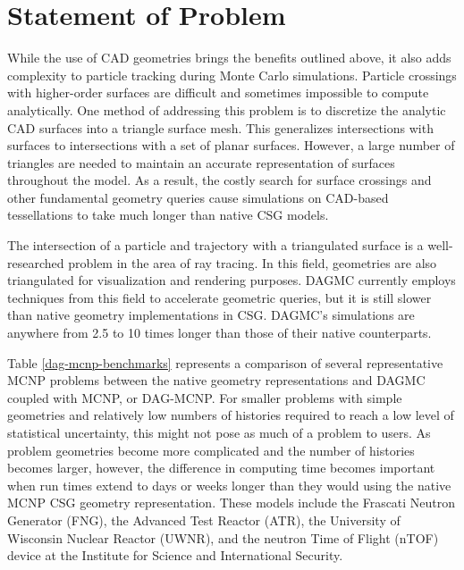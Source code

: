 \section{Statement of Problem}\label{sec:problem-statement}

While the use of CAD geometries brings the benefits outlined above, it also adds
complexity to particle tracking during Monte Carlo simulations. Particle
crossings with higher-order surfaces are difficult and sometimes impossible to
compute analytically. One method of addressing this problem is to discretize the
analytic CAD surfaces into a triangle surface mesh. This generalizes
intersections with surfaces to intersections with a set of planar
surfaces. However, a large number of triangles are needed to maintain an
accurate representation of surfaces throughout the model. As a result, the
costly search for surface crossings and other fundamental geometry
queries cause simulations on CAD-based tessellations
to take much longer than native CSG models.

The intersection of a particle and trajectory with a triangulated surface is a
well-researched problem in the area of ray tracing. In this field, geometries
are also triangulated for visualization and rendering purposes. DAGMC currently
employs techniques from this field to accelerate geometric queries, but it is
still slower than native geometry implementations in CSG. DAGMC's simulations
are anywhere from 2.5 to 10 times longer than those of their native
counterparts.

Table \ref{dag-mcnp-benchmarks} represents a comparison of several
representative MCNP problems between the native geometry representations and
DAGMC coupled with MCNP, or DAG-MCNP. For smaller problems with simple
geometries and relatively low numbers of histories required to reach a low level
of statistical uncertainty, this might not pose as much of a problem to
users. As problem geometries become more complicated and the number of histories
becomes larger, however, the difference in computing time becomes important when
run times extend to days or weeks longer than they would using the native MCNP
CSG geometry representation. These models include the Frascati Neutron Generator
(FNG), the Advanced Test Reactor (ATR), the University of Wisconsin Nuclear
Reactor (UWNR), and the neutron Time of Flight (nTOF) device at the Institute for
Science and International Security.

